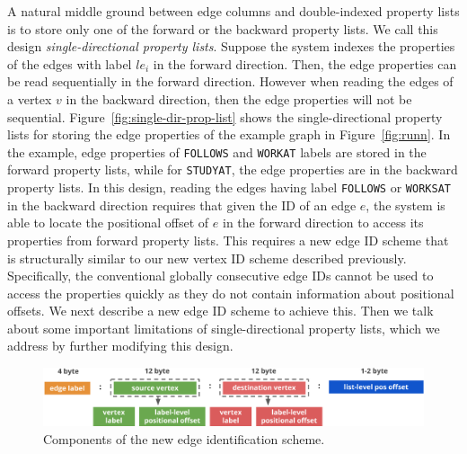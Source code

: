 A natural middle ground between edge columns and double-indexed property lists is to store only one of the forward or the backward property lists. We call this design \emph{single-directional property lists}. Suppose the system indexes the properties of the edges with label $le_i$ in the forward direction. Then, the edge properties can be read sequentially in the forward direction. However when reading the edges of a vertex $v$ in the backward direction, then the edge properties will not be sequential. Figure~\ref{fig:single-dir-prop-list} shows the single-directional property lists for storing the edge properties of the example graph in Figure~\ref{fig:runn}. In the example, edge properties of \texttt{FOLLOWS} and \texttt{WORKAT} labels are stored in the forward property lists, while for \texttt{STUDYAT}, the edge properties are in the backward property lists. In this design, reading the edges having label \texttt{FOLLOWS} or \texttt{WORKSAT} in the backward direction requires that given the ID of an edge $e$, the system is able to locate the positional offset of $e$ in the forward direction to access its properties from forward property lists. This requires a new edge ID scheme that is structurally similar to our new vertex ID scheme described previously. Specifically, the conventional globally consecutive edge IDs cannot be used to access the properties quickly as they do not contain information about positional offsets. We next describe a new edge ID scheme to achieve this. Then we talk about some important limitations of single-directional property lists, which we address by further modifying this design.

\begin{figure}
	\hfill\includegraphics[scale=0.78]{img/edge-scheme}\hspace*{\fill}
	\captionsetup{justification=centering}
	\caption{Components of the new edge identification scheme.}
	\label{fig:edge-scheme}
\end{figure}

